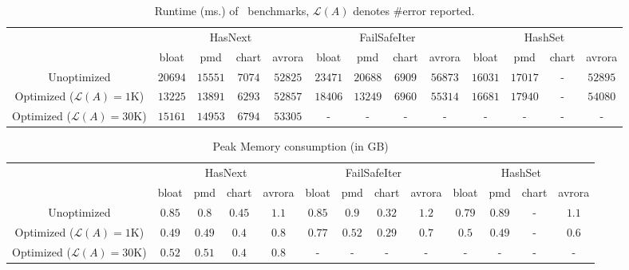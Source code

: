 \begin{table*}[!ht]
\centering
\small
\begin{tabular}{|c|c|c|c|c||c|c|c|c||c|c|c|c|}
\hline
  \multirow{2}{*}{}                                 & 
\multicolumn{4}{c||}{HasNext}           & \multicolumn{4}{c||}{FailSafeIter}
   &    \multicolumn{4}{c|}{HashSet}
      \\ \cline{2-13}                                              
           
           
 & bloat & pmd & chart & avrora & bloat & pmd & chart & avrora& bloat
 & pmd & chart & avrora\\ \hline
 
  Unoptimized  & $20694$ & $15551$ & $7074$ & $52825$ & $23471$ & $20688$ &
  $6909$ & $56873$ & $16031$ & $17017$ & - & $52895$\\\hline
 
 Optimized ($\mathcal{L}(A) = 1$K)  & $13225$ & $13891$ & $6293$ & $52857$ &
 $18406$ & $13249$ & $6960$ & $55314$ & $16681$ & $17940$ & - & $54080$\\\hline
  
  Optimized ($\mathcal{L}(A) = 30$K)  & $15161$ & $14953$ & $6794$ & $53305$ &
  - & - & - & - & - & - & - & -\\\hline
     

\end{tabular}
\caption{Runtime (ms.) of \dacapo\ benchmarks, $\mathcal{L}(A)$ denotes
\#error reported.}
\label{table:time}
\end{table*}


\begin{table*}[!ht]
\centering
\small
\begin{tabular}{|c|c|c|c|c||c|c|c|c||c|c|c|c|}
\hline
  \multirow{2}{*}{}                                 & 
\multicolumn{4}{c||}{HasNext}           & \multicolumn{4}{c||}{FailSafeIter}
   &    \multicolumn{4}{c|}{HashSet}
      \\ \cline{2-13}                                              
           
           
 & bloat & pmd & chart & avrora & bloat & pmd & chart & avrora& bloat
 & pmd & chart & avrora\\ \hline
 
  Unoptimized  & $0.85$ & $0.8$ & $0.45$ & $1.1$ & 
              $0.85$ & $0.9$ & $0.32$ & $1.2$ & 
              $0.79$ & $0.89$ & - & $1.1$\\\hline
 
 Optimized ($\mathcal{L}(A) = 1$K)  & 
 			$0.49$ & $0.49$ & $0.4$ & $0.8$ &
 			  $0.77$ & $0.52$ & $0.29$ & $0.7$ & 
 			  $0.5$ & $0.49$ & - & $0.6$\\\hline
  
  Optimized ($\mathcal{L}(A) = 30$K)  & 
  $0.52$ & $0.51$ & $0.4$ & $0.8$ &
  - & - & - & - &
   - & - & - & -\\\hline
     

\end{tabular}
\caption{Peak Memory consumption (in GB)}
\label{table:memory}
\end{table*}



